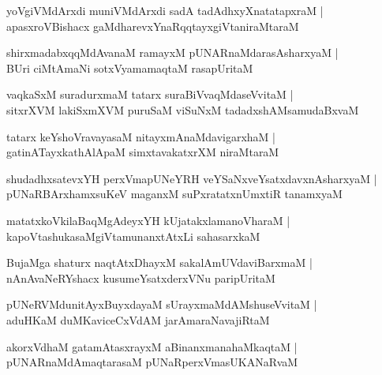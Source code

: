 \documentclass[twoside,12pt,openright]{book}
\newcounter{shloka}[chapter]
\begin{document}
\begin{shloka}%
yoVgiVMdArxdi muniVMdArxdi sadA tadAdhxyXnatatapxraM |\\
apasxroVBishacx gaMdharevxYnaRqqtayxgiVtaniraMtaraM 
\end{shloka}

\begin{shloka}%
shirxmadabxqqMdAvanaM ramayxM pUNARnaMdarasAsharxyaM |\\
BUri ciMtAmaNi sotxVyamamaqtaM rasapUritaM 
\end{shloka}

\begin{shloka}%
vaqkaSxM suradurxmaM tatarx suraBiVvaqMdaseVvitaM |\\
sitxrXVM lakiSxmXVM puruSaM viSuNxM tadadxshAMsamudaBxvaM 
\end{shloka}

\begin{shloka}%
tatarx keYshoVravayasaM nitayxmAnaMdavigarxhaM |\\
gatinATayxkathAlApaM simxtavakatxrXM  niraMtaraM 
\end{shloka}

\begin{shloka}%
shudadhxsatevxYH perxVmapUNeYRH veYSaNxveYsatxdavxnAsharxyaM |\\
pUNaRBArxhamxsuKeV maganxM suPxratatxnUmxtiR tanamxyaM 
\end{shloka}

\begin{shloka}%
matatxkoVkilaBaqMgAdeyxYH kUjatakxlamanoVharaM |\\
kapoVtashukasaMgiVtamunanxtAtxLi sahasarxkaM 
\end{shloka}

\begin{shloka}%
BujaMga shaturx naqtAtxDhayxM sakalAmUVdaviBarxmaM |\\
nAnAvaNeRYshacx kusumeYsatxderxVNu paripUritaM 
\end{shloka}

\begin{shloka}%
pUNeRVMdunitAyxBuyxdayaM sUrayxmaMdAMshuseVvitaM |\\
aduHKaM duMKaviceCxVdAM jarAmaraNavajiRtaM 
\end{shloka}

\begin{shloka}%
akorxVdhaM gatamAtasxrayxM aBinanxmanahaMkaqtaM |\\
pUNARnaMdAmaqtarasaM pUNaRperxVmasUKANaRvaM 
\end{shloka}
\end{document}
